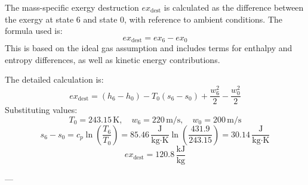The mass-specific exergy destruction \( ex_{\text{dest}} \) is calculated as the difference between the exergy at state 6 and state 0, with reference to ambient conditions. The formula used is:  
\[
ex_{\text{dest}} = ex_{6} - ex_{0}
\]  
This is based on the ideal gas assumption and includes terms for enthalpy and entropy differences, as well as kinetic energy contributions.  

The detailed calculation is:  
\[
ex_{\text{dest}} = (h_6 - h_0) - T_0 (s_6 - s_0) + \frac{w_6^2}{2} - \frac{w_0^2}{2}
\]  
Substituting values:  
\[
T_0 = 243.15 \, \text{K}, \quad w_6 = 220 \, \text{m/s}, \quad w_0 = 200 \, \text{m/s}
\]  
\[
s_6 - s_0 = c_p \ln\left(\frac{T_6}{T_0}\right) = 85.46 \, \frac{\text{J}}{\text{kg·K}} \ln\left(\frac{431.9}{243.15}\right) = 30.14 \, \frac{\text{J}}{\text{kg·K}}
\]  
\[
ex_{\text{dest}} = 120.8 \, \frac{\text{kJ}}{\text{kg}}
\]  

---